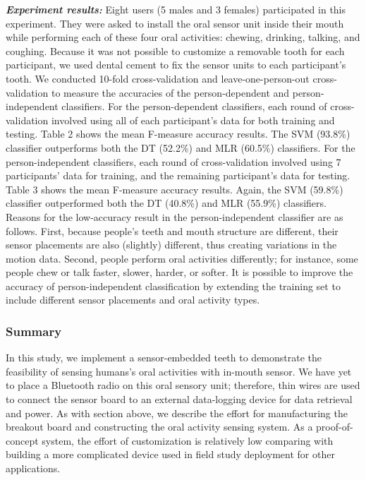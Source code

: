 \textsl{\textbf{Experiment results:}}
Eight users (5 males and 3 females) participated in this experiment. They were asked to install the oral sensor unit inside their mouth while performing each of these four oral activities: chewing, drinking, talking, and coughing. Because it was not possible to customize a removable tooth for each participant, we used dental cement to fix the sensor units to each participant's tooth.
We conducted 10-fold cross-validation and leave-one-person-out cross-validation to measure the accuracies of the person-dependent and person-independent classifiers. For the person-dependent classifiers, each round of cross-validation involved using all of each participant's data for both training and testing. Table 2 shows the mean F-measure accuracy results. The SVM (93.8\%) classifier outperforms both the DT (52.2\%) and MLR (60.5\%) classifiers. 
For the person-independent classifiers, each round of cross-validation involved using 7 participants' data for training, and the remaining participant's data for testing. Table 3 shows the mean F-measure accuracy results. Again, the SVM (59.8\%) classifier outperformed both the DT (40.8\%) and MLR (55.9\%) classifiers. Reasons for the low-accuracy result in the person-independent classifier are as follows.
First, because people's teeth and mouth structure are different, their sensor placements are also (slightly) different, thus creating variations in the motion data. Second, people perform oral activities differently; for instance, some people chew or talk faster, slower, harder, or softer. It is possible to improve the accuracy of person-independent classification by extending the training set to include different sensor placements and oral activity types.

\subsubsection{Summary}
In this study, we implement a sensor-embedded teeth \cite{Li2013teeth} to demonstrate the feasibility of sensing humans's oral activities with in-mouth sensor. We have yet to place a Bluetooth radio on this oral sensory unit; therefore, thin wires are used to connect the sensor board to an external data-logging device for data retrieval and power.
As with section above, we describe the effort for manufacturing the breakout board and constructing the oral activity sensing system.
As a proof-of-concept system, the effort of customization is relatively low comparing with building a more complicated device used in field study deployment for other applications.

